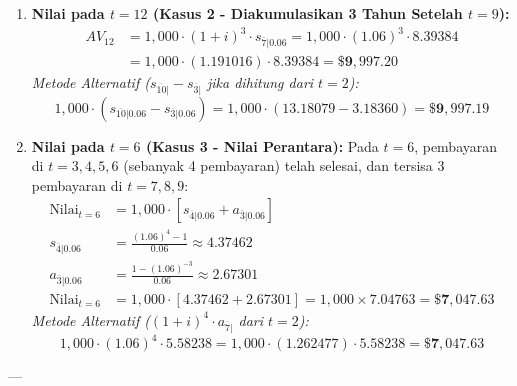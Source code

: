\documentclass[11pt,a4paper]{article}
\begin{document}
\begin{examplebox}
\begin{enumerate}[label=(\alph*)]
    \item \textbf{Nilai pada $t = 12$ (Kasus 2 - Diakumulasikan 3 Tahun Setelah $t = 9$):}
    \begin{align*}
        AV_{12} &= 1{,}000 \cdot (1+i)^3 \cdot s_{\overline{7}|0.06} = 1{,}000 \cdot (1.06)^3 \cdot 8.39384 \\
                &= 1{,}000 \cdot (1.191016) \cdot 8.39384 = \mathbf{\$9{,}997.20}
    \end{align*}
    \textit{Metode Alternatif ($s_{\overline{10}|} - s_{\overline{3}|}$ jika dihitung dari $t=2$):}
    \begin{equation*}
        1{,}000 \cdot (s_{\overline{10}|0.06} - s_{\overline{3}|0.06}) = 1{,}000 \cdot (13.18079 - 3.18360) = \mathbf{\$9{,}997.19}
    \end{equation*}

    \item \textbf{Nilai pada $t = 6$ (Kasus 3 - Nilai Perantara):}
    Pada $t = 6$, pembayaran di $t = 3, 4, 5, 6$ (sebanyak 4 pembayaran) telah selesai, dan tersisa 3 pembayaran di $t = 7, 8, 9$:
    \begin{align*}
        \text{Nilai}_{t=6} &= 1{,}000 \cdot \left[ s_{\overline{4}|0.06} + a_{\overline{3}|0.06} \right] \\
        s_{\overline{4}|0.06} &= \frac{(1.06)^4 - 1}{0.06} \approx 4.37462 \\
        a_{\overline{3}|0.06} &= \frac{1 - (1.06)^{-3}}{0.06} \approx 2.67301 \\
        \text{Nilai}_{t=6} &= 1{,}000 \cdot [4.37462 + 2.67301] = 1{,}000 \times 7.04763 = \mathbf{\$7{,}047.63}
    \end{align*}
    \textit{Metode Alternatif ($(1+i)^4 \cdot a_{\overline{7}|}$ dari $t=2$):}
    \begin{equation*}
        1{,}000 \cdot (1.06)^4 \cdot 5.58238 = 1{,}000 \cdot (1.262477) \cdot 5.58238 = \mathbf{\$7{,}047.63}
    \end{equation*}
\end{enumerate}
\end{examplebox}

---
\end{document}

